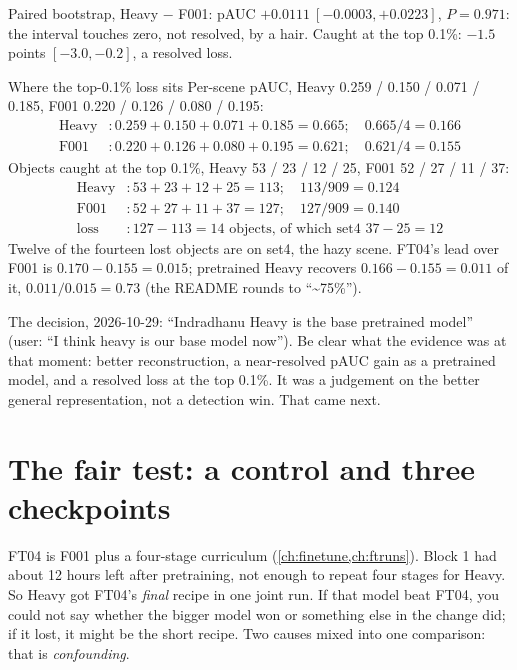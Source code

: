 Paired bootstrap, Heavy $-$ F001: pAUC $+0.0111\ [-0.0003,+0.0223]$, $P=0.971$: the interval touches zero, not
resolved, by a hair. Caught at the top 0.1\%: $-1.5$ points $[-3.0,-0.2]$, a resolved loss.

\begin{worked}[label={we:heavy:set4}]{Where the top-0.1\% loss sits}
Per-scene pAUC, Heavy 0.259 / 0.150 / 0.071 / 0.185, F001 0.220 / 0.126 / 0.080 / 0.195:
\begin{align*}
\text{Heavy} &: 0.259+0.150+0.071+0.185 = 0.665;\quad 0.665/4 = 0.166\\
\text{F001} &: 0.220+0.126+0.080+0.195 = 0.621;\quad 0.621/4 = 0.155
\end{align*}
Objects caught at the top 0.1\%, Heavy 53 / 23 / 12 / 25, F001 52 / 27 / 11 / 37:
\begin{align*}
\text{Heavy} &: 53+23+12+25 = 113;\quad 113/909 = 0.124\\
\text{F001} &: 52+27+11+37 = 127;\quad 127/909 = 0.140\\
\text{loss} &: 127-113 = 14 \text{ objects, of which set4 } 37-25 = 12
\end{align*}
Twelve of the fourteen lost objects are on set4, the hazy scene. FT04's lead over F001 is
$0.170-0.155=0.015$; pretrained Heavy recovers $0.166-0.155=0.011$ of it, $0.011/0.015=0.73$ (the README rounds
to ``\textasciitilde75\%'').
\end{worked}

The decision, 2026-10-29: ``Indradhanu Heavy is the base pretrained model'' (user: ``I think heavy is our base
model now''). Be clear what the evidence was at that moment: better reconstruction, a near-resolved pAUC gain as a
pretrained model, and a resolved loss at the top 0.1\%. It was a judgement on the better general representation,
not a detection win. That came next.

\section{The fair test: a control and three checkpoints}\label{sec:heavy:control}

FT04 is F001 plus a four-stage curriculum (\cref{ch:finetune,ch:ftruns}). Block 1 had about 12 hours left after
pretraining, not enough to repeat four stages for Heavy. So Heavy got FT04's \emph{final} recipe in one joint run.
If that model beat FT04, you could not say whether the bigger model won or something else in the change did; if it
lost, it might be the short recipe. Two causes mixed into one comparison: that is
\emph{confounding}.

